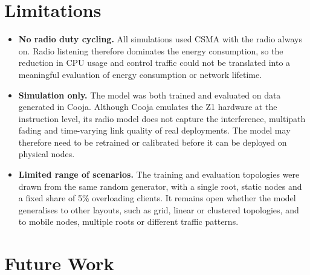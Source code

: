 \section{Limitations}

\begin{itemize}
    \item \textbf{No radio duty cycling.} All simulations used CSMA
        with the radio always on. Radio listening therefore dominates
        the energy consumption, so the reduction in CPU usage and
        control traffic could not be translated into a meaningful
        evaluation of energy consumption or network lifetime.
    \item \textbf{Simulation only.} The model was both trained and
        evaluated on data generated in Cooja. Although Cooja emulates
        the Z1 hardware at the instruction level, its radio model does
        not capture the interference, multipath fading and
        time-varying link quality of real deployments. The model may
        therefore need to be retrained or calibrated before it can be
        deployed on physical nodes.
    \item \textbf{Limited range of scenarios.} The training and
        evaluation topologies were drawn from the same random
        generator, with a single root, static nodes and a fixed share
        of 5\% overloading clients. It remains open whether the model
        generalises to other layouts, such as grid, linear or
        clustered topologies, and to mobile nodes, multiple roots or
        different traffic patterns.
\end{itemize}

\section{Future Work}

